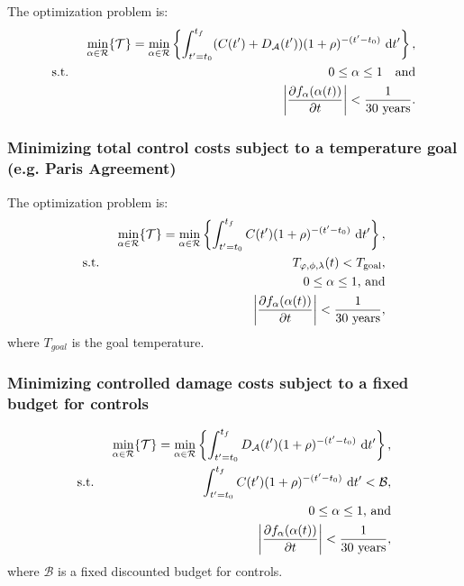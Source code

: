\documentclass{article}
\begin{document}
The optimization problem is:
\begin{align}
    && \min_{\alpha \in \mathcal{R}} \{ \mathcal{T} \} = \min_{\alpha \in \mathcal{R}} \left\{
    \int_{t'=t_{0}}^{t_{f}}
    (C(t') + D_{\mathcal{A}}(t')) (1 + \rho)^{-(t'-t_{0})} \text{ d}t' \right\},
    \\
    & \text{s.t. }
    & 0 \leq \alpha \leq 1\quad \text{and}\\
    && \abs{\pdv{f_{\alpha}(\alpha(t))}{t}} < \frac{1}{30\text{ years}}.
\end{align}

\subsubsection{Minimizing total control costs subject to a temperature goal (e.g. Paris Agreement)}

The optimization problem is:
\begin{align}
    & & \min_{\alpha \in \mathcal{R}} \{ \mathcal{T} \} = \min_{\alpha \in \mathcal{R}} \left\{
    \int_{t'=t_{0}}^{t_{f}}
    C(t') (1 + \rho)^{-(t'-t_{0})} \text{ d}t' \right\},
    \\
    & \text{s.t. }
    & T_{\varphi, \phi, \lambda}(t) < T_{\text{goal}},\\
    && 0 \leq \alpha \leq 1\text{, and}\\
    &&\abs{\pdv{f_{\alpha}(\alpha(t))}{t}} < \frac{1}{30\text{ years}},
\end{align}
where $T_{goal}$ is the goal temperature.

\subsubsection{Minimizing controlled damage costs subject to a fixed budget for controls}

\begin{align}
    & & \min_{\alpha \in \mathcal{R}} \{ \mathcal{T} \} = \min_{\alpha \in \mathcal{R}} \left\{
    \int_{t'=t_{0}}^{t_{f}}
    D_{\mathcal{A}}(t') (1 + \rho)^{-(t'-t_{0})} \text{ d}t' \right\},\\
    & \text{s.t. }
    & \int_{t'=t_{0}}^{t_{f}}
    C(t') (1 + \rho)^{-(t'-t_{0})} \text{ d}t' < \mathcal{B},\\
    &&0 \leq \alpha \leq 1\text{, and}\\
    &&\abs{\pdv{f_{\alpha}(\alpha(t))}{t}} < \frac{1}{30\text{ years}},
\end{align}
where $\mathcal{B}$ is a fixed discounted budget for controls.



\end{document}
